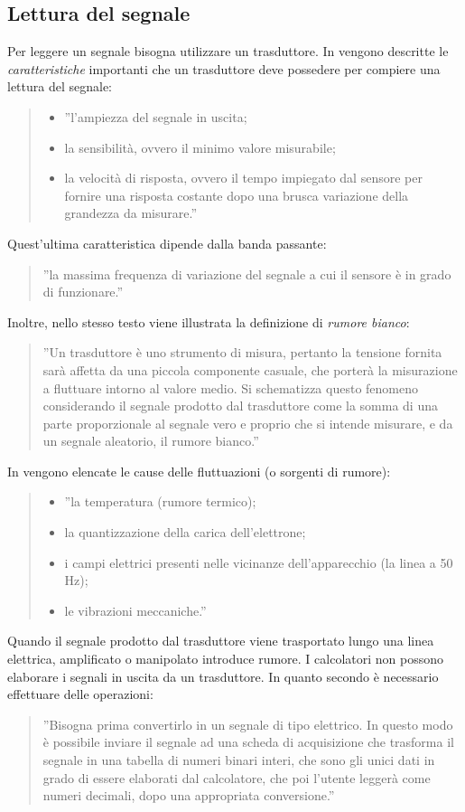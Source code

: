 \documentclass[a4paper]{report} %
\begin{document}
\subsection{Lettura del segnale}
Per leggere un segnale bisogna utilizzare un trasduttore. In \cite{art:rif.2} vengono descritte le \textit{caratteristiche} importanti che un trasduttore deve possedere per compiere una lettura del segnale: 
\begin{quote}
	\begin{itemize}
		\item ''l'ampiezza del segnale in uscita;
		\item la sensibilità, ovvero il minimo valore misurabile;
		\item la velocità di risposta, ovvero il tempo impiegato dal sensore per fornire una risposta costante dopo una brusca variazione della grandezza da misurare.''
	\end{itemize}
\end{quote}
Quest'ultima caratteristica dipende dalla banda passante:
\begin{quote}
	''la massima frequenza di variazione del segnale a cui il sensore è in grado di funzionare.'' 
\end{quote}
Inoltre, nello stesso testo viene illustrata la definizione di \textit{rumore bianco}:
\begin{quote}
	''Un trasduttore è uno strumento di misura, pertanto la tensione fornita sarà affetta da una piccola componente casuale, che porterà la misurazione a fluttuare intorno al valore medio. Si schematizza questo fenomeno considerando il segnale prodotto dal trasduttore come la somma di una parte proporzionale al segnale vero e proprio che si intende misurare, e da un segnale aleatorio, il rumore bianco.''	
\end{quote}
In \cite{art:rif.2} vengono elencate le cause delle fluttuazioni (o sorgenti di rumore):
\begin{quote}	
	\begin{itemize}
	\item ''la temperatura (rumore termico);
	\item la quantizzazione della carica dell'elettrone;
	\item i campi elettrici presenti nelle vicinanze dell'apparecchio (la linea a 50 Hz);
	\item le vibrazioni meccaniche.''
	\end{itemize}
\end{quote}
Quando il segnale prodotto dal trasduttore viene trasportato lungo una linea elettrica, amplificato o manipolato introduce rumore.
I calcolatori non possono elaborare i segnali in uscita da un trasduttore. In quanto secondo \cite{art:rif.2} è necessario effettuare delle operazioni: 
\begin{quote}
	''Bisogna prima convertirlo in un segnale di tipo elettrico. In questo modo è possibile inviare il segnale ad una scheda di acquisizione che trasforma il segnale in una tabella di numeri binari interi, che sono gli unici dati in grado di essere elaborati dal calcolatore, che poi l'utente leggerà come numeri decimali, dopo una appropriata conversione.''
\end{quote}
\end{document}
